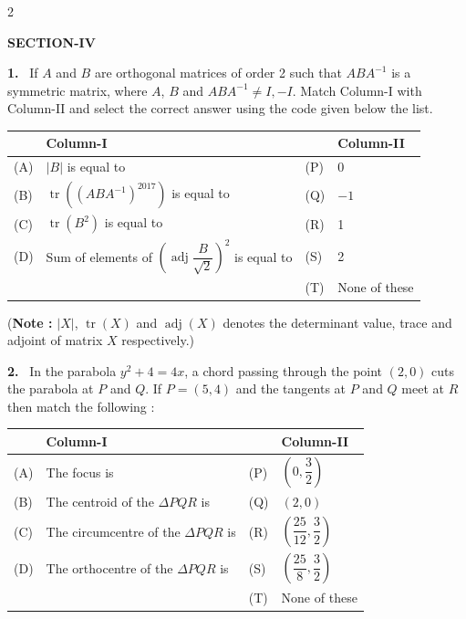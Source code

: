 \documentclass[10pt]{extarticle}
\newcommand{\sect}[1]{\par\smallskip\noindent\textbf{#1}\par}
\newcommand{\qn}[1]{\par\smallskip\noindent\textbf{#1.}~}
\begin{document}
\begin{multicols}{2}
\sect{SECTION-IV}
\qn{1} If $A$ and $B$ are orthogonal matrices of order 2 such that $ABA^{-1}$ is a symmetric matrix, where $A$, $B$ and $ABA^{-1}\ne I,-I$. Match Column-I with Column-II and select the correct answer using the code given below the list.
\par\nobreak
\begin{center}\footnotesize
\begin{tabular}{|p{0.5cm}|p{4.0cm}|p{0.6cm}|p{2.0cm}|}
\hline
 & Column-I & & Column-II\\ \hline
(A) & $|B|$ is equal to & (P) & 0\\ \hline
(B) & $\operatorname{tr}\left(\left(ABA^{-1}\right)^{2017}\right)$ is equal to & (Q) & $-1$\\ \hline
(C) & $\operatorname{tr}(B^2)$ is equal to & (R) & 1\\ \hline
(D) & Sum of elements of $\left(\operatorname{adj}\dfrac{B}{\sqrt2}\right)^2$ is equal to & (S) & 2\\ \hline
 & & (T) & None of these\\ \hline
\end{tabular}
\end{center}
(\textbf{Note :} $|X|$, $\operatorname{tr}(X)$ and $\operatorname{adj}(X)$ denotes the determinant value, trace and adjoint of matrix $X$ respectively.)

\qn{2} In the parabola $y^2+4=4x$, a chord passing through the point $(2,0)$ cuts the parabola at $P$ and $Q$. If $P=(5,4)$ and the tangents at $P$ and $Q$ meet at $R$ then match the following :
\par\nobreak
\begin{center}\footnotesize
\begin{tabular}{|p{0.5cm}|p{3.4cm}|p{0.6cm}|p{1.8cm}|}
\hline
 & Column-I & & Column-II\\ \hline
(A) & The focus is & (P) & $\left(0,\dfrac32\right)$\\ \hline
(B) & The centroid of the $\Delta PQR$ is & (Q) & $(2,0)$\\ \hline
(C) & The circumcentre of the $\Delta PQR$ is & (R) & $\left(\dfrac{25}{12},\dfrac32\right)$\\ \hline
(D) & The orthocentre of the $\Delta PQR$ is & (S) & $\left(\dfrac{25}{8},\dfrac32\right)$\\ \hline
 & & (T) & None of these\\ \hline
\end{tabular}
\end{center}

\end{multicols}
\end{document}
